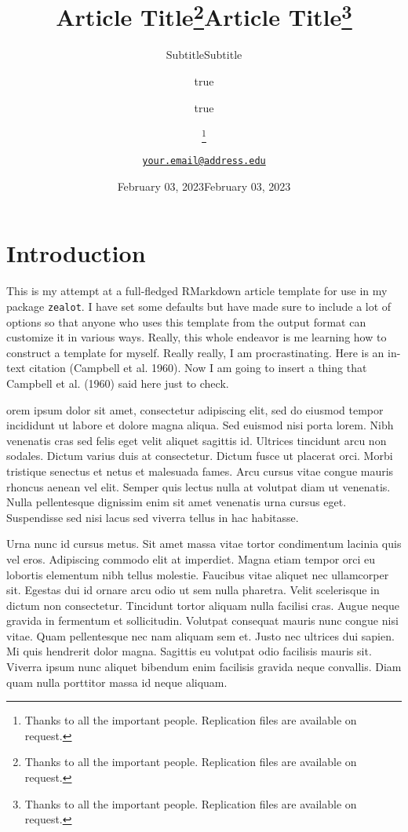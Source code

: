 \documentclass[
  11pt,
  twocolumn]{article}
\title{Article Title\thanks{Thanks to all the important people.
Replication files are available on request.}}
\subtitle{Subtitle}
\author{true \and true}
\date{February 03, 2023}
\title{Article Title\thanks{Thanks to all the important people.
Replication files are available on request.}}
\subtitle{Subtitle}
\author{%
\textsc{}\thanks{Thanks to all the important people. Replication files
are available on request.} \\[1ex] %
\normalsize  \\ %
\normalsize \href{mailto:\href{mailto:your.email@address.edu}{\nolinkurl{your.email@address.edu}}}{\href{mailto:your.email@address.edu}{\nolinkurl{your.email@address.edu}}} %
}
\date{February 03, 2023} %
\begin{document}
\maketitle








\hypertarget{introduction}{%
\section{Introduction}\label{introduction}}

This is my attempt at a full-fledged RMarkdown article template for use
in my package \texttt{zealot}. I have set some defaults but have made
sure to include a lot of options so that anyone who uses this template
from the output format can customize it in various ways. Really, this
whole endeavor is me learning how to construct a template for myself.
Really really, I am procrastinating. Here is an in-text citation
(Campbell et al. 1960). Now I am going to insert a thing that Campbell
et al. (1960) said here just to check.

orem ipsum dolor sit amet, consectetur adipiscing elit, sed do eiusmod
tempor incididunt ut labore et dolore magna aliqua. Sed euismod nisi
porta lorem. Nibh venenatis cras sed felis eget velit aliquet sagittis
id. Ultrices tincidunt arcu non sodales. Dictum varius duis at
consectetur. Dictum fusce ut placerat orci. Morbi tristique senectus et
netus et malesuada fames. Arcu cursus vitae congue mauris rhoncus aenean
vel elit. Semper quis lectus nulla at volutpat diam ut venenatis. Nulla
pellentesque dignissim enim sit amet venenatis urna cursus eget.
Suspendisse sed nisi lacus sed viverra tellus in hac habitasse.

Urna nunc id cursus metus. Sit amet massa vitae tortor condimentum
lacinia quis vel eros. Adipiscing commodo elit at imperdiet. Magna etiam
tempor orci eu lobortis elementum nibh tellus molestie. Faucibus vitae
aliquet nec ullamcorper sit. Egestas dui id ornare arcu odio ut sem
nulla pharetra. Velit scelerisque in dictum non consectetur. Tincidunt
tortor aliquam nulla facilisi cras. Augue neque gravida in fermentum et
sollicitudin. Volutpat consequat mauris nunc congue nisi vitae. Quam
pellentesque nec nam aliquam sem et. Justo nec ultrices dui sapien. Mi
quis hendrerit dolor magna. Sagittis eu volutpat odio facilisis mauris
sit. Viverra ipsum nunc aliquet bibendum enim facilisis gravida neque
convallis. Diam quam nulla porttitor massa id neque aliquam.
\end{document}
